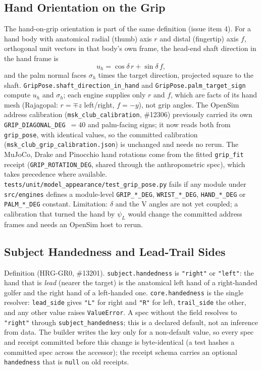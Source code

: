 \documentclass[11pt,a4paper]{article}
\begin{document}
\subsection{Hand Orientation on the Grip}
The hand-on-grip orientation is part of the same definition (issue item 4).
For a hand body with anatomical radial (thumb) axis $r$ and distal
(fingertip) axis $f$, orthogonal unit vectors in that body's own frame, the
head-end shaft direction in the hand frame is
\[
u_h=\cos\delta\,r+\sin\delta\,f ,
\]
and the palm normal faces $\sigma_h$ times the target direction, projected
square to the shaft. \texttt{GripPose.shaft\_direction\_in\_hand} and
\texttt{GripPose.palm\_target\_sign} compute $u_h$ and $\sigma_h$; each engine
supplies only $r$ and $f$, which are facts of its hand mesh (Rajagopal:
$r=\mp z$ left/right, $f=-y$), not grip angles. The OpenSim address
calibration (\texttt{msk\_club\_calibration}, \#12306) previously carried its
own \texttt{GRIP\_DIAGONAL\_DEG}~$=40$ and palm-facing signs; it now reads both
from \texttt{grip\_pose}, with identical values, so the committed calibration
(\texttt{msk\_club\_grip\_calibration.json}) is unchanged and needs no rerun.
The MuJoCo, Drake and Pinocchio hand rotations come from the fitted
\texttt{grip\_fit} receipt (\texttt{GRIP\_ROTATION\_DEG}, shared through the
anthropometric spec), which takes precedence where available.
\texttt{tests/unit/model\_appearance/test\_grip\_pose.py} fails if any module
under \texttt{src/engines} defines a module-level \texttt{GRIP\_*\_DEG},
\texttt{WRIST\_*\_DEG}, \texttt{HAND\_*\_DEG} or \texttt{PALM\_*\_DEG}
constant. Limitation: $\delta$ and the V angles are not yet coupled; a
calibration that turned the hand by $\psi_L$ would change the committed
address frames and needs an OpenSim host to rerun.

\subsection{Subject Handedness and Lead-Trail Sides}
Definition (HRG-GR0, \#13201). \texttt{subject.handedness} is
\texttt{"right"} or \texttt{"left"}: the hand that is \emph{lead} (nearer the
target) is the anatomical left hand of a right-handed golfer and the right
hand of a left-handed one. \texttt{core.handedness} is the single resolver:
\texttt{lead\_side} gives \texttt{"L"} for right and \texttt{"R"} for left,
\texttt{trail\_side} the other, and any other value raises \texttt{ValueError}.
A spec without the field resolves to \texttt{"right"} through
\texttt{subject\_handedness}; this is a declared default, not an inference from
data. The builder writes the key only for a non-default value, so every spec
and receipt committed before this change is byte-identical (a test hashes a
committed spec across the accessor); the receipt schema carries an optional
\texttt{handedness} that is \texttt{null} on old receipts.
\end{document}
